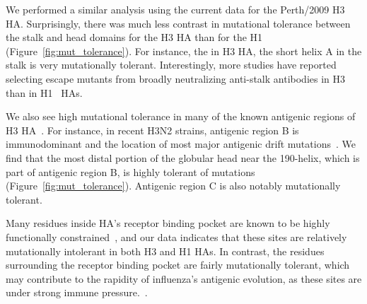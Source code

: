 \documentclass[9pt,twocolumn,twoside]{pnas-new}
\begin{document}
We performed a similar analysis using the current data for the Perth/2009 H3 HA.
Surprisingly, there was much less contrast in mutational tolerance between the stalk and head domains for the H3 HA than for the H1 (Figure~\ref{fig:mut_tolerance}).
For instance, the in H3 HA, the short helix A in the stalk is very mutationally tolerant.
Interestingly, more studies have reported selecting escape mutants from broadly neutralizing anti-stalk antibodies in H3~\cite{ekiert2011highly, friesen2014common, chai2016two, yamayoshi2017human} than in H1~\cite{okuno1993common,doud2017quantifying} HAs.

We also see high mutational tolerance in many of the known antigenic regions of H3 HA~\cite{wiley1981structural}.
For instance, in recent H3N2 strains, antigenic region B is immunodominant and the location of most major antigenic drift mutations~\cite{chambers2015identification,koel2013substitutions,popova2012immunodominance}.
We find that the most distal portion of the globular head near the 190-helix, which is part of antigenic region B, is highly tolerant of mutations (Figure~\ref{fig:mut_tolerance}).
Antigenic region C is also notably mutationally tolerant.

Many residues inside HA's receptor binding pocket are known to be highly functionally constrained~\cite{wilson1981structure,martin1998studies}, and our data indicates that these sites are relatively mutationally intolerant in both H3 and H1 HAs.
In contrast, the residues surrounding the receptor binding pocket are fairly mutationally tolerant, which may contribute to the rapidity of influenza's antigenic evolution, as these sites are under strong immune pressure.~\cite{wiley1981structural,koel2013substitutions}.
\end{document}

